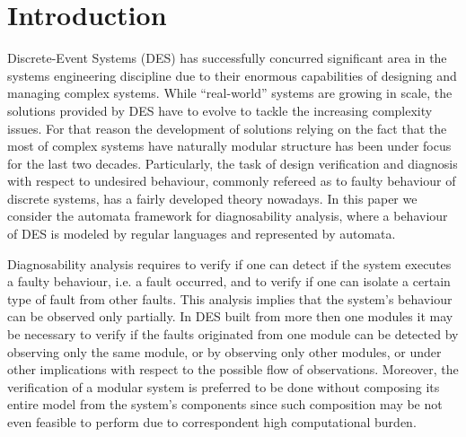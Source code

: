 \documentclass[letterpaper, 10pt, conference]{ieeeconf}
\begin{document}
\newtheorem{assumption}{Assumption}
\newtheorem{definition}{Definition}
\newtheorem{conjecture}{Conjecture}
\newtheorem{lemma}{Lemma}
\newtheorem{corollary}{Corollary}
\newtheorem{example}{Example}
\newtheorem{theorem}{Theorem}

\section{Introduction}

Discrete-Event Systems (DES) has successfully concurred significant area in the
systems engineering discipline due to their enormous capabilities of designing
and managing complex systems. While ``real-world'' systems are growing in scale,
the solutions provided by DES have to evolve to tackle the increasing complexity
issues. For that reason the development of solutions relying on the fact that
the most of complex systems have naturally modular structure has been under
focus for the last two decades. Particularly, the task of design verification
and diagnosis with respect to undesired behaviour, commonly refereed as to
faulty behaviour of discrete systems, has a fairly developed theory nowadays.
In this paper we consider the automata framework for diagnosability analysis,
where a behaviour of DES is modeled by regular languages and represented by
automata.

Diagnosability analysis requires to verify if one can detect if the system
executes a faulty behaviour, i.e. a fault occurred, and to verify if one
can isolate a certain type of fault from other faults. This analysis implies
that the system's behaviour can be observed only partially. In DES built from
more then one modules it may be necessary to verify if the faults originated
from one module can be detected by observing only the same module, or by
observing only other modules, or under other implications with respect to the
possible flow of observations. Moreover, the verification of a modular system is
preferred to be done without composing its entire model from the system's
components since such composition may be not even feasible to perform due to 
correspondent high computational burden.
\end{document}
